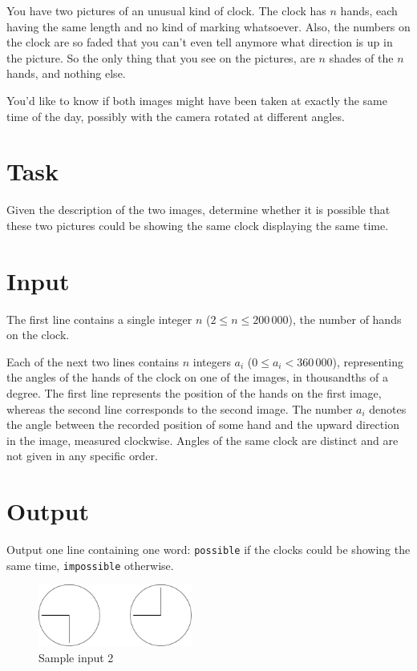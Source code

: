 
You have two pictures of an unusual kind of clock. The clock has $n$ hands, each having the same length and no kind of marking whatsoever. Also, the numbers on the clock are so faded that you can't even tell anymore what direction is up in the picture. So the only thing that you see on the pictures, are $n$ shades of the $n$ hands, and nothing else.

You'd like to know if both images might have been taken at exactly the same
time of the day, possibly with the camera rotated at different angles.

\section*{Task}

Given the description of the two images, determine whether it is possible that these two pictures could be showing the same clock displaying the same time.

\section*{Input}

The first line contains a single integer $n$ ($2 \leq n \leq 200\, 000$), the number of hands on the clock.

Each of the next two lines contains $n$ integers $a_i$ ($0 \leq a_i <
360\, 000$), representing the angles of the hands of the clock on one
of the images, in thousandths of a degree. The first line represents
the position of the hands on the first image, whereas the second line
corresponds to the second image. The number $a_i$ denotes the angle
between the recorded position of some hand and the upward direction in
the image, measured clockwise. Angles of the same clock are distinct
and are not given in any specific order.

\section*{Output}

Output one line containing one word: \verb+possible+ if the clocks could be showing the same time, \verb+impossible+ otherwise.

\begin{figure}[h]
  \centering
  \includegraphics[width=0.45\textwidth]{sample2}
  \caption{Sample input 2}
  \label{fig:sample2}
\end{figure}
